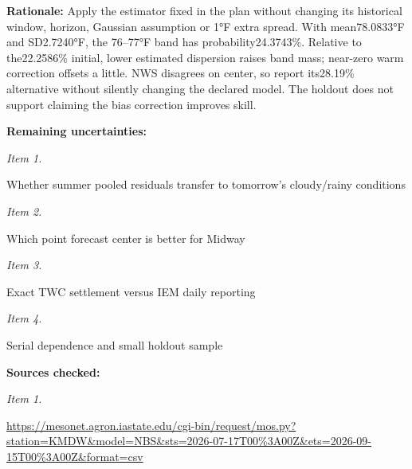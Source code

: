\documentclass[11pt]{article}
\begin{document}
\par\noindent\textbf{Rationale:} Apply the estimator fixed in the plan without changing its historical window, horizon, Gaussian assumption or 1°F extra spread. With mean78.0833°F and SD2.7240°F, the 76–77°F band has probability24.3743\%. Relative to the22.2586\% initial, lower estimated dispersion raises band mass; near-zero warm correction offsets a little. NWS disagrees on center, so report its28.19\% alternative without silently changing the declared model. The holdout does not support claiming the bias correction improves skill.

\par\noindent\textbf{Remaining uncertainties:} \par \par\noindent\textit{Item 1.}\par Whether summer pooled residuals transfer to tomorrow’s cloudy/rainy conditions

\par\noindent\textit{Item 2.}\par Which point forecast center is better for Midway

\par\noindent\textit{Item 3.}\par Exact TWC settlement versus IEM daily reporting

\par\noindent\textit{Item 4.}\par Serial dependence and small holdout sample

\par\noindent\textbf{Sources checked:} \par \par\noindent\textit{Item 1.}\par \href{https://mesonet.agron.iastate.edu/cgi-bin/request/mos.py?station=KMDW\&model=NBS\&sts=2026-07-17T00\%3A00Z\&ets=2026-09-15T00\%3A00Z\&format=csv}{https://meso\hspace{0pt}net.agron.ia\hspace{0pt}state.edu/cg\hspace{0pt}i-bin/reques\hspace{0pt}t/mos.py?sta\hspace{0pt}tion=KMDW\&mo\hspace{0pt}del=NBS\&sts=\hspace{0pt}2026-07-17T0\hspace{0pt}0\%3A00Z\&ets=\hspace{0pt}2026-09-15T0\hspace{0pt}0\%3A00Z\&form\hspace{0pt}at=csv}
\end{document}
